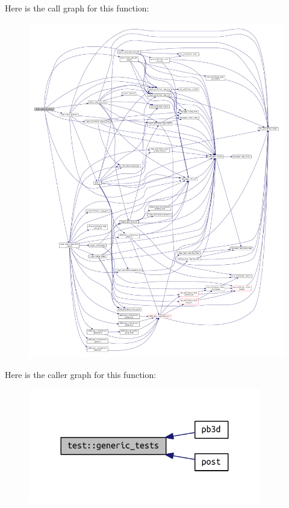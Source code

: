 Here is the call graph for this function\+:\nopagebreak
\begin{figure}[H]
\begin{center}
\leavevmode
\includegraphics[width=350pt]{namespacetest_aca21ee464c0b1f4b617177afdde110ec_cgraph}
\end{center}
\end{figure}
Here is the caller graph for this function\+:\nopagebreak
\begin{figure}[H]
\begin{center}
\leavevmode
\includegraphics[width=288pt]{namespacetest_aca21ee464c0b1f4b617177afdde110ec_icgraph}
\end{center}
\end{figure}
\mbox{\label{namespacetest_a1c04fcea513c8c2efb189049d810318a}} 

